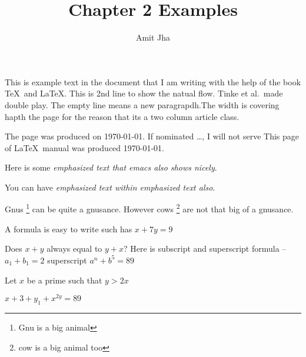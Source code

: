 \documentclass[twocolumn,12pt]{article}
\title{Chapter 2 Examples}
\author{Amit Jha}
\begin{document}
\maketitle

This is example text in the document that I am writing with the help of the book \TeX \ and \LaTeX.
This is 2nd line to show the natual flow.
Tinke et al.\  made double play.
The empty line means a new paragrapdh.The width is covering hapth the page for the reason that its a two column article class.

The page was produced on \today.
If nominated \ldots, I will not serve
This page of \LaTeX\ manual was produced \today.


Here is some \emph{emphasized text that emacs also shows nicely}.

You can have \emph{emphasized text \emph{within} emphasized text also}.

Gnus \footnote{Gnu is a big animal} can be quite a gnusance.
However cows \footnote{cow is a big animal too} are not that big of a gnusance.


A formula is easy to write such has \(x+7y = 9\)

Does \(x  + y \) always equal to \(y+x\)?
Here is subscript and superscript formula -- \(a_1 + b_1 = 2\) superscript \(a^n + b^5 = 89\)

Let $x$ be a prime such that $y > 2x$

\begin{math} x + 3+ y_1 + x^{2y} = 89 \end{math}
\end{document}
